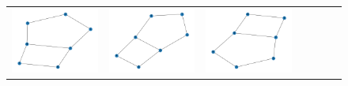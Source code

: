 \documentclass[11pt,a4paper,openright,oneside]{book}
\numberwithin{equation}{section}
\begin{document}
{\begin{figure}[H]
\begin{adjustwidth}{-3cm}{-3cm}
\begin{tabular}{>{\centering\arraybackslash}m{1.5cm}| m{2.5cm} |m{2.5cm} |m{2.5cm} |m{2.5cm} |m{2.5cm} |m{2.5cm}}
        \includegraphics[width=\linewidth]{media/nn/graph-0.5-tnale-0.5-RR1.png} &
        \includegraphics[width=\linewidth]{media/nn/graph-0.75-tnale-0.75-RR1.png} &
        \includegraphics[width=\linewidth]{media/nn/graph-1-tnale-1-RR1.png} &

\end{tabular}
\end{adjustwidth}
\end{figure}}
\end{document}
